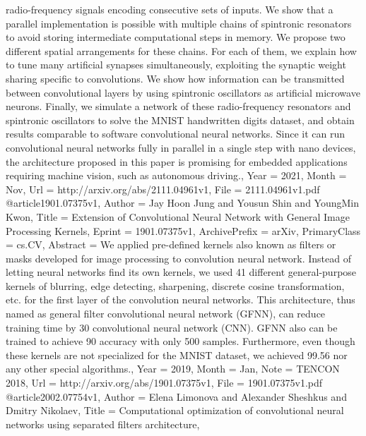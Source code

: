 {{{{{radio-frequency signals encoding consecutive sets of inputs. We show that a
parallel implementation is possible with multiple chains of spintronic
resonators to avoid storing intermediate computational steps in memory. We
propose two different spatial arrangements for these chains. For each of them,
we explain how to tune many artificial synapses simultaneously, exploiting the
synaptic weight sharing specific to convolutions. We show how information can
be transmitted between convolutional layers by using spintronic oscillators as
artificial microwave neurons. Finally, we simulate a network of these
radio-frequency resonators and spintronic oscillators to solve the MNIST
handwritten digits dataset, and obtain results comparable to software
convolutional neural networks. Since it can run convolutional neural networks
fully in parallel in a single step with nano devices, the architecture proposed
in this paper is promising for embedded applications requiring machine vision,
such as autonomous driving.},
Year          = {2021},
Month         = {Nov},
Url           = {http://arxiv.org/abs/2111.04961v1},
File          = {2111.04961v1.pdf}
}
@article{1901.07375v1,
Author        = {Jay Hoon Jung and Yousun Shin and YoungMin Kwon},
Title         = {Extension of Convolutional Neural Network with General Image Processing
  Kernels},
Eprint        = {1901.07375v1},
ArchivePrefix = {arXiv},
PrimaryClass  = {cs.CV},
Abstract      = {We applied pre-defined kernels also known as filters or masks developed for
image processing to convolution neural network. Instead of letting neural
networks find its own kernels, we used 41 different general-purpose kernels of
blurring, edge detecting, sharpening, discrete cosine transformation, etc. for
the first layer of the convolution neural networks. This architecture, thus
named as general filter convolutional neural network (GFNN), can reduce
training time by 30%
convolutional neural network (CNN). GFNN also can be trained to achieve 90%
accuracy with only 500 samples. Furthermore, even though these kernels are not
specialized for the MNIST dataset, we achieved 99.56%
nor any other special algorithms.},
Year          = {2019},
Month         = {Jan},
Note          = {TENCON 2018},
Url           = {http://arxiv.org/abs/1901.07375v1},
File          = {1901.07375v1.pdf}
}
@article{2002.07754v1,
Author        = {Elena Limonova and Alexander Sheshkus and Dmitry Nikolaev},
Title         = {Computational optimization of convolutional neural networks using
  separated filters architecture},
}}}}
